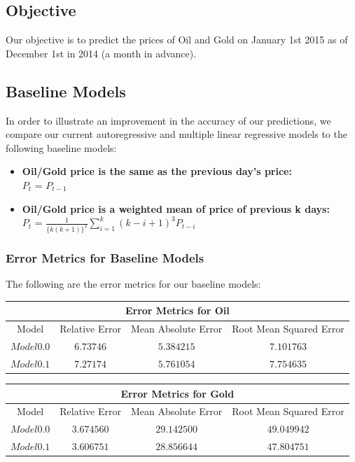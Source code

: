 \documentclass[runningheads]{llncs}
\begin{document}
\subsection{Objective}
Our objective is to predict the prices of Oil and Gold on January 1st 2015 as of December 1st in 2014 (a month in advance).

\subsection{Baseline Models}
In order to illustrate an improvement in the accuracy of our predictions, we compare our current autoregressive and multiple linear regressive models to the following baseline models:

\begin {itemize}
\item \textbf{Oil/Gold price is the same as the previous day's price:} \\
$P_{t}$ = $P_{t-1}$\\
\item \textbf{Oil/Gold price is a weighted mean of price of previous k days:} \\
$P_{t}$ = $\frac{1}{\{k(k+1)\}^2}\sum\limits_{i=1}^k (k-i+1)^3P_{t-i}$
\end {itemize}

\subsubsection {Error Metrics for Baseline Models} The following are the error metrics for our baseline models: \\

\begin{tabular}{|c|c|c|c|}
\hline
\multicolumn{4}{|c|}{Error Metrics for Oil} \\
\hline
Model & Relative Error & Mean Absolute Error & Root Mean Squared Error \\ \hline
$ Model 0.0 $ & $6.73746$ & $5.384215$ & $7.101763$ \\ \hline
$ Model 0.1 $ & $7.27174$ & $5.761054$ & $7.754635$\\ \hline
\end{tabular}


\begin{tabular}{|c|c|c|c|}
\hline
\multicolumn{4}{|c|}{Error Metrics for Gold} \\
\hline
Model & Relative Error & Mean Absolute Error & Root Mean Squared Error \\ \hline
$ Model 0.0 $ & $3.674560$ & $29.142500$ & $49.049942$ \\ \hline
$ Model 0.1 $ & $3.606751$ & $28.856644$ & $47.804751$\\ \hline
\end{tabular}
\end{document}
